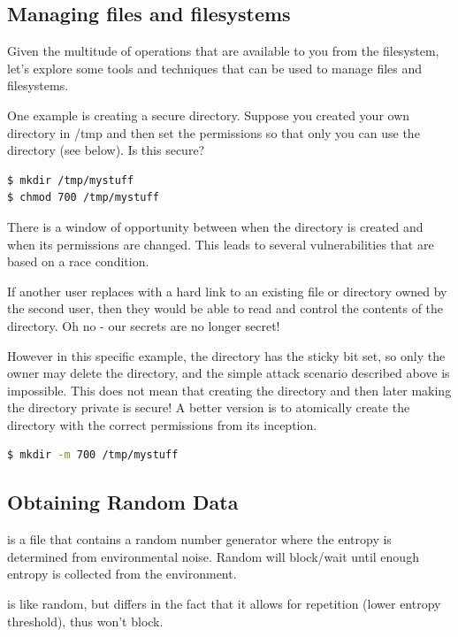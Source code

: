 \subsection{Managing files and filesystems}

Given the multitude of operations that are available to you from the filesystem, let's explore some tools and techniques that can be used to manage files and filesystems.

One example is creating a secure directory.
Suppose you created your own directory in /tmp and then set the permissions so that only you can use the directory (see below).
Is this secure?

\begin{lstlisting}[language=bash]
$ mkdir /tmp/mystuff
$ chmod 700 /tmp/mystuff
\end{lstlisting}

There is a window of opportunity between when the directory is created and when its permissions are changed.
This leads to several vulnerabilities that are based on a race condition.

If another user replaces  with a hard link to an existing file or directory owned by the second user, then they would be able to read and control the contents of the  directory.
Oh no - our secrets are no longer secret!

However in this specific example, the  directory has the sticky bit set, so only the owner may delete the  directory, and the simple attack scenario described above is impossible.
This does not mean that creating the directory and then later making the directory private is secure!
A better version is to atomically create the directory with the correct permissions from its inception.

\begin{lstlisting}[language=bash]
$ mkdir -m 700 /tmp/mystuff
\end{lstlisting}

\subsection{Obtaining Random Data}

 is a file that contains a random number generator where the entropy is determined from environmental noise.
Random will block/wait until enough entropy is collected from the environment.

 is like random, but differs in the fact that it allows for repetition (lower entropy threshold), thus won't block.

